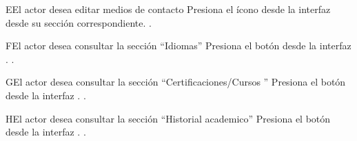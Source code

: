 \begin{UCtrayectoriaA}{E}{El actor desea editar medios de contacto}
	\UCpaso [\UCsist] Presiona el ícono \IUEditar{} desde la interfaz  desde su sección correspondiente.
	.
\end{UCtrayectoriaA} 

\begin{UCtrayectoriaA}{F}{El actor desea consultar la sección ``Idiomas''}
	\UCpaso [\UCsist] Presiona el botón  desde la interfaz .
	.
\end{UCtrayectoriaA}

\begin{UCtrayectoriaA}{G}{El actor desea consultar la sección ``Certificaciones/Cursos ''}
	\UCpaso [\UCsist] Presiona el botón  desde la interfaz .
	.
\end{UCtrayectoriaA} 


\begin{UCtrayectoriaA}{H}{El actor desea consultar la sección ``Historial academico''}
	\UCpaso [\UCsist] Presiona el botón  desde la interfaz .
	.
\end{UCtrayectoriaA} 



